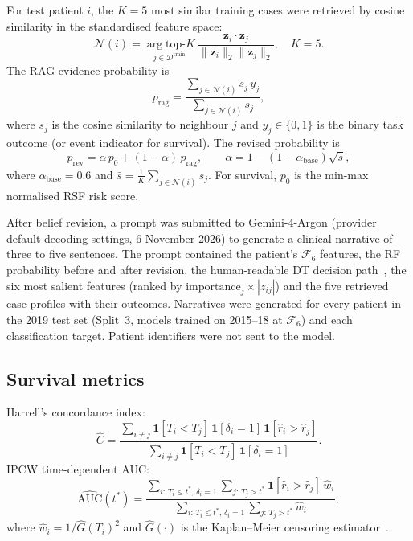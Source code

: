 \documentclass[pdflatex,sn-nature]{sn-jnl}
\begin{document}
For test patient $i$, the $K=5$ most similar training cases were
retrieved by cosine similarity in the standardised feature space:
\begin{equation}
\mathcal{N}(i) = \underset{j \in \mathcal{D}^{\text{train}}}
  {\arg\text{top-}K}\
  \frac{\mathbf{z}_i \cdot \mathbf{z}_j}
       {\|\mathbf{z}_i\|_2 \|\mathbf{z}_j\|_2}, \quad K = 5.
\label{eq:rag}
\end{equation}
The RAG evidence probability is
\begin{equation}
p_{\text{rag}} =
  \frac{\sum_{j \in \mathcal{N}(i)} s_j\, y_j}
       {\sum_{j \in \mathcal{N}(i)} s_j},
\label{eq:prag}
\end{equation}
where $s_j$ is the cosine similarity to neighbour $j$ and
$y_j \in \{0,1\}$ is the binary task outcome (or event indicator
for survival).
The revised probability is
\begin{equation}
p_{\text{rev}} = \alpha\, p_0 + (1-\alpha)\, p_{\text{rag}},
\qquad
\alpha = 1 - (1-\alpha_{\text{base}})\sqrt{\bar{s}},
\label{eq:prev}
\end{equation}
where $\alpha_\text{base}=0.6$ and
$\bar{s} = \frac{1}{K}\sum_{j \in \mathcal{N}(i)} s_j$.
For survival, $p_0$ is the min-max normalised RSF risk score.

After belief revision, a prompt was submitted to Gemini-4-Argon
(provider default decoding settings, 6 November 2026) to generate a
clinical narrative of three to five sentences.
The prompt contained the patient's $\mathcal{F}_6$ features, the RF
probability before and after revision, the human-readable DT decision
path~\cite{[CITE:Rudin2019]}, the six most salient features (ranked by
$\text{importance}_j \times |z_{ij}|$) and the five retrieved case
profiles with their outcomes.
Narratives were generated for every patient in the 2019 test set
(Split~3, models trained on 2015--18 at $\mathcal{F}_6$) and each
classification target.
Patient identifiers were not sent to the model.

\subsection{Survival metrics}\label{sec:surv_methods}

Harrell's concordance index:
\begin{equation}
\hat{C} =
\frac{
  \sum_{i \neq j}
  \mathbf{1}[T_i < T_j]\,
  \mathbf{1}[\delta_i = 1]\,
  \mathbf{1}[\hat{r}_i > \hat{r}_j]
}{
  \sum_{i \neq j}
  \mathbf{1}[T_i < T_j]\,
  \mathbf{1}[\delta_i = 1]
}.
\label{eq:cindex}
\end{equation}
IPCW time-dependent AUC:
\begin{equation}
\widehat{\text{AUC}}(t^*) =
\frac{
  \sum_{i:\,T_i \leq t^*,\,\delta_i=1}
  \sum_{j:\,T_j > t^*}
  \mathbf{1}[\hat{r}_i > \hat{r}_j]\,\hat{w}_i
}{
  \sum_{i:\,T_i \leq t^*,\,\delta_i=1}
  \sum_{j:\,T_j > t^*}
  \hat{w}_i
},
\label{eq:itauc}
\end{equation}
where $\hat{w}_i = 1/\hat{G}(T_i)^2$ and $\hat{G}(\cdot)$ is the
Kaplan--Meier censoring estimator~\cite{[CITE:Uno2011]}.
\end{document}

